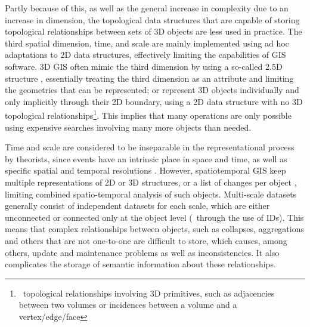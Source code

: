 Partly because of this, as well as the general increase in complexity due to an increase in dimension, the topological data structures that are capable of storing topological relationships between sets of 3D objects are less used in practice.
The third spatial dimension, time, and scale are mainly implemented using ad hoc adaptations to 2D data structures, effectively limiting the capabilities of GIS software.
3D GIS often mimic the third dimension by using a so-called 2.5D structure \citep{Raper89}, essentially treating the third dimension as an attribute and limiting the geometries that can be represented; or represent 3D objects individually and only implicitly through their 2D boundary, using a 2D data structure with no 3D topological relationships\footnote{\ie\ topological relationships involving 3D primitives, such as adjacencies between two volumes or incidences between a volume and a vertex/edge/face}.
This implies that many operations are only possible using expensive searches involving many more objects than needed.

Time and scale are considered to be inseparable in the representational process by theorists, since events have an intrinsic place in space and time, as well as specific spatial and temporal resolutions \citep{Raper00}.
However, spatiotemporal GIS keep multiple representations of 2D \citep{Armstrong88} or 3D \citep{Hamre97} structures, or a list of changes per object \citep{Worboys92,Peuquet94}, limiting combined spatio-temporal analysis of such objects.
Multi-scale datasets generally consist of independent datasets for each scale, which are either unconnected or connected only at the object level (\eg\ through the use of IDs).
This means that complex relationships between objects, such as collapses, aggregations and others that are not one-to-one are difficult to store, which causes, among others, update and maintenance problems as well as inconsistencies.
It also complicates the storage of semantic information about these relationships.